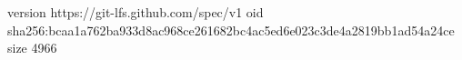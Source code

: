 version https://git-lfs.github.com/spec/v1
oid sha256:bcaa1a762ba933d8ac968ce261682bc4ac5ed6e023c3de4a2819bb1ad54a24ce
size 4966
